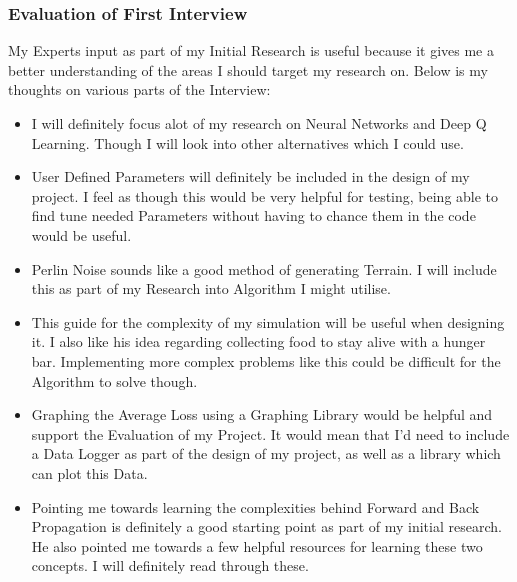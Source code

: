 \begin{flushleft}
            \subsubsection{Evaluation of First Interview}
                My Experts input as part of my Initial Research is useful because it gives me a better understanding of the areas I should target my
                research on. Below is my thoughts on various parts of the Interview:

                \begin{itemize}
                    \item I will definitely focus alot of my research on Neural Networks and Deep Q Learning. Though I will look into other
                    alternatives which I could use.

                    \item User Defined Parameters will definitely be included in the design of my project. I feel as though this would be
                    very helpful for testing, being able to find tune needed Parameters without having to chance them in the code would be useful.

                    \item Perlin Noise sounds like a good method of generating Terrain. I will include this as part of my Research into Algorithm 
                    I might utilise.

                    \item This guide for the complexity of my simulation will be useful when designing it. I also like his idea regarding collecting food to 
                    stay alive with a hunger bar. Implementing more complex problems like this could be difficult for the Algorithm to solve though. 
                    
                    \item Graphing the Average Loss using a Graphing Library would be helpful and support the Evaluation of my Project. It would mean
                    that I'd need to include a Data Logger as part of the design of my project, as well as a library which can plot this Data.

                    \item Pointing me towards learning the complexities behind Forward and Back Propagation is definitely a good starting point
                    as part of my initial research. He also pointed me towards a few helpful resources for learning these two concepts. I will definitely
                    read through these.
                \end{itemize}

\end{flushleft}
